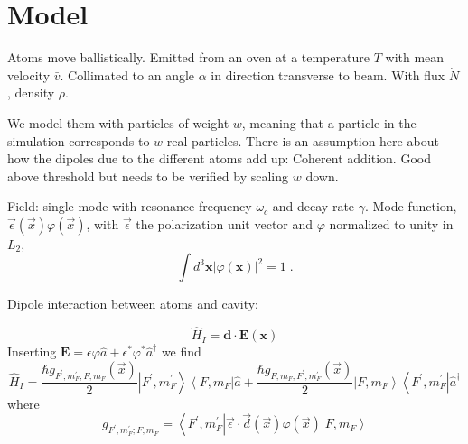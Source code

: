\documentclass[aps, superscriptaddress, groupedaddress, preprint]{revtex4}
\begin{document}
\section{Model}

Atoms move ballistically.  Emitted from an oven at a temperature
$T$ with mean velocity $\bar{v}$.  Collimated to an angle
$\alpha$ in direction transverse to beam.  With flux $\dot N$,
density $\rho$.

We model them with particles of weight $w$, meaning that a
particle in the simulation corresponds to $w$ real particles.
There is an assumption here about how the dipoles due to the
different atoms add up: Coherent addition.  Good above threshold
but needs to be verified by scaling $w$ down.

Field: single mode with resonance frequency $\omega_c$ and decay
rate $\gamma$.  Mode function,
$\vec{\epsilon}(\vec{x})\varphi(\vec{x})$, with $\vec{\epsilon}$
the polarization unit vector and $\varphi$ normalized to unity in
$L_2$,
\begin{equation}
\int d^3\mathbf{x} \left|\varphi(\mathbf{x})\right|^2 = 1\;.
\end{equation}

Dipole interaction between atoms and cavity:

\begin{equation}
\hat H_I=\mathbf{d}\cdot\mathbf{E}(\mathbf{x})
\end{equation}
Inserting $\mathbf{E}=\epsilon\varphi\hat a +
\epsilon^*\varphi^* \hat a^\dagger$ we find
\begin{equation}
\hat H_I =
\frac{\hbar g_{ F^\prime, m_F^\prime;F, m_F}(\vec{x})}{2}
\left|F^\prime,m_F^\prime\right>\left<F, m_F\right|\hat a
+
\frac{\hbar g_{F, m_F;F^\prime, m_F^\prime}(\vec{x})}{2}
\left|F, m_F\right>\left<F^\prime,m_F^\prime\right|\hat a^\dagger
\end{equation}
where
\begin{equation}
g_{ F^\prime, m_F^\prime;F, m_F}=
\left<F^\prime,m_F^\prime\right|
\vec{\epsilon}\cdot\vec{d}(\vec{x})\varphi(\vec{x})
\left|F,m_F\right>
\end{equation}
\end{document}
